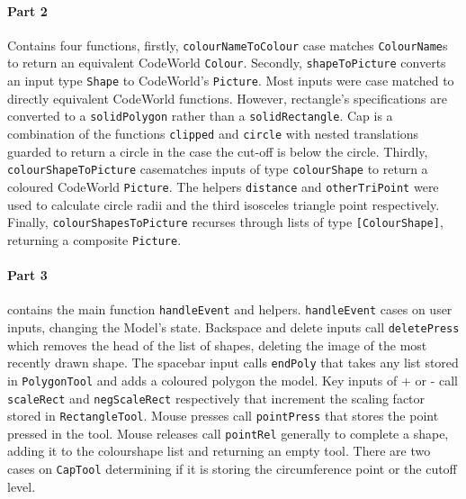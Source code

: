 \documentclass[11pt]{article}
\begin{document}
\paragraph{Part 2} Contains four functions, firstly, \verb|colourNameToColour|  case matches \verb|ColourName|s to return an equivalent CodeWorld  \verb|Colour|. Secondly, \verb|shapeToPicture| converts an input type \verb|Shape| to CodeWorld's  \verb|Picture|. Most inputs were case matched to directly equivalent CodeWorld functions. However, rectangle's specifications are converted to a \verb|solidPolygon| rather than a \verb|solidRectangle|.  Cap is a combination of the functions \verb|clipped| and \verb|circle| with nested translations guarded to return a circle in the case the cut-off is below the circle. Thirdly, \verb|colourShapeToPicture| casematches inputs of type \verb|colourShape| to return a coloured CodeWorld  \verb|Picture|. The helpers \verb|distance| and \verb|otherTriPoint| were used to calculate circle radii and the third isosceles triangle point respectively. Finally, \verb|colourShapesToPicture| recurses through lists of type \verb|[ColourShape]|, returning a composite \verb|Picture|.

\paragraph{Part 3} contains the main function  \verb|handleEvent| and helpers. \verb|handleEvent| cases on user inputs, changing the Model's state. Backspace and delete inputs call \verb|deletePress| which removes the head of the list of shapes, deleting the image of the most recently drawn shape. The spacebar input calls  \verb|endPoly| that takes any list stored in  \verb|PolygonTool| and adds a coloured polygon the model. Key inputs of + or - call \verb|scaleRect| and \verb|negScaleRect| respectively that increment the scaling factor stored in \verb|RectangleTool|. Mouse presses call \verb|pointPress| that stores the point pressed in the tool. Mouse releases call \verb|pointRel| generally to complete a shape, adding it to the colourshape list and returning an empty tool. There are two cases on \verb|CapTool| determining if it is storing the circumference point or the cutoff level.
\end{document}

